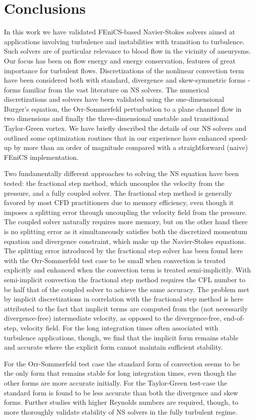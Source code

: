 \section{Conclusions}

In this work we have validated FEniCS-based Navier-Stokes solvers
aimed at applications involving turbulence and instabilities with
transition to turbulence. Such solvers are of particular relevance
to blood flow in the vicinity of aneurysms.
Our focus has been on flow energy and energy
conservation, features of great importance for turbulent
flows. Discretizations of the nonlinear convection term have been
considered both with standard, divergence and skew-symmetric forms -
forms familiar from the vast literature on NS solvers. The
numerical discretizations and solvers have been validated using the
one-dimensional Burger's equation, the Orr-Sommerfeld perturbation to
a plane channel flow in two dimensions and finally the
three-dimensional unstable and transitional Taylor-Green vortex. We
have briefly described the details of our NS solvers and outlined some
optimization routines that in our experience have enhanced speed-up by
more than an order of magnitude compared with a straightforward
(naive) FEniCS implementation.

Two fundamentally different approaches to solving the NS equation have
been tested: the fractional step method, which uncouples the velocity
from the pressure, and a fully coupled solver. The fractional step
method is generally favored by most CFD practitioners due to memory
efficiency, even though it imposes a splitting error through
uncoupling the velocity field from the pressure. The coupled solver
naturally requires more memory, but on the other hand there is no
splitting error as it simultaneously satisfies both the discretized
momentum equation and divergence constraint, which make up the
Navier-Stokes equations. The splitting error introduced by the
fractional step solver has been found here with the Orr-Sommerfeld
test case to be small when convection is treated explicitly and
enhanced when the convection term is treated semi-implicitly. With
semi-implicit convection the fractional step method requires the CFL
number to be half that of the coupled solver to achieve the same
accuracy. The problem met by implicit discretizations in correlation
with the fractional step method is here attributed to the fact that
implicit terms are computed from the (not necessarily divergence-free)
intermediate velocity, as opposed to the divergence-free, end-of-step,
velocity field. For the long integration times often associated with
turbulence applications, though, we find that the implicit form
remains stable and accurate where the explicit form cannot maintain
sufficient stability. 

For the Orr-Sommerfeld test case the standard form of convection seems
to be the only form that remains stable for long integration times,
even though the other forms are more accurate initially. For the
Taylor-Green test-case the standard form is found to be less accurate
than both the divergence and skew forms. Further studies with higher
Reynolds numbers are required, though, to more thoroughly validate
stability of NS solvers in the fully turbulent regime.
